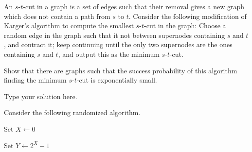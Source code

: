 \documentclass[addpoints,12pt]{exam}
\newcommand{\E}{\mathbb{E}}
\begin{document}
\begin{questions}
          \question[5]  An $s$-$t$-cut in a graph is a set of edges such that
          their removal gives a new graph which does not contain a path from $s$
          to $t$. Consider the following modification of Karger's algorithm to
          compute the smallest $s$-$t$-cut in the graph: Choose a random edge in
          the graph such that it not between supernodes containing $s$ and $t$,
          and contract it; keep continuing until the only two supernodes are the
          ones containing $s$ and $t$, and output this as the minimum
          $s$-$t$-cut.

          Show that there are graphs such that the success probability of this
          algorithm finding the minimum $s$-$t$-cut is exponentially small.
          \begin{solution}
            Type your solution here.
          \end{solution}
          
          \question Consider the following randomized algorithm.
          
          \begin{algorithm}[H]

            Set $X \gets 0$


            Set $Y \gets 2^X - 1$
            \caption{}
          \end{algorithm}



\end{questions}
\end{document}
